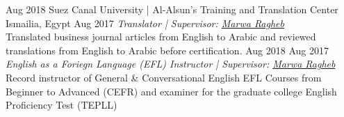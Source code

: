 \begin{experiences}
    \emptySeparator

     
   \researchexperience
    {Aug 2018}   {Suez Canal University | Al-Alsun's Training and Translation Center {\normalfont  ~ 
    }}{Ismailia, Egypt}{}
    {Aug 2017} {\textit{Translator | Supervisor: \href{https://www.researchgate.net/profile/Marwa-Ragheb-2}{Marwa Ragheb}}\\
    Translated business journal articles from English to Arabic and reviewed translations from English to Arabic before certification.
    }
    \researchexperience
    {Aug 2018}  {}{}{}
    {Aug 2017}  {\textit{English as a Foriegn Language (EFL) Instructor | Supervisor: \href{https://www.researchgate.net/profile/Marwa-Ragheb-2}{Marwa Ragheb}}\\
    Record instructor of General \& Conversational English EFL Courses from Beginner to Advanced (CEFR) and examiner for the graduate college English Proficiency Test (TEPLL)
    }
    
\end{experiences}
\vspace{-4mm}
